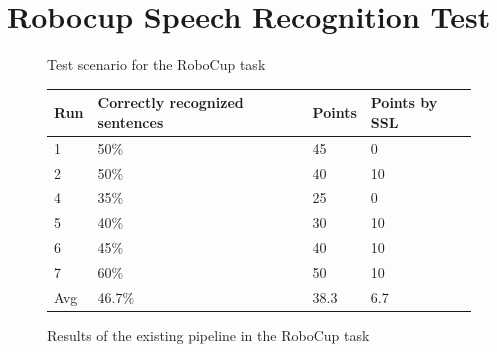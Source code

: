 



\section{Robocup Speech Recognition Test}


\begin{figure}[ht]	
	\centering
	
	\caption{Test scenario for the RoboCup task}
	\label{pic:eval_task}
\end{figure}

\begin{figure}[ht]
	\begin{tabular}{ | l | l | l | l |}
		\hline
		Run & Correctly recognized sentences & Points & Points by SSL \\ \hline
		1 & 50\% & 45 & 0 \\ \hline
		2 & 50\% & 40 & 10 \\ \hline
		4 & 35\% & 25 &  0 \\ \hline
		5 & 40\% & 30 & 10 \\ \hline
		6 & 45\% & 40 & 10 \\ \hline
		7 & 60\% & 50 & 10 \\ \hhline{|=|=|=|=|} 
		Avg & 46.7\% & 38.3 & 6.7 \\
		\hline
	\end{tabular}
	\caption{Results of the existing pipeline in the RoboCup task}
	\label{pic:eval_task_results_old}
\end{figure}

